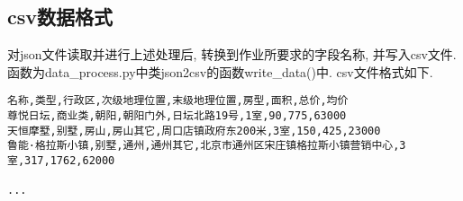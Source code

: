 \subsection{csv数据格式}
对json文件读取并进行上述处理后, 转换到作业所要求的字段名称, 并写入csv文件.
函数为data\_process.py中类json2csv的函数write\_data()中.
csv文件格式如下.
\begin{lstlisting}
名称,类型,行政区,次级地理位置,末级地理位置,房型,面积,总价,均价
尊悦日坛,商业类,朝阳,朝阳门外,日坛北路19号,1室,90,775,63000
天恒摩墅,别墅,房山,房山其它,周口店镇政府东200米,3室,150,425,23000
鲁能·格拉斯小镇,别墅,通州,通州其它,北京市通州区宋庄镇格拉斯小镇营销中心,3室,317,1762,62000

...
\end{lstlisting}
